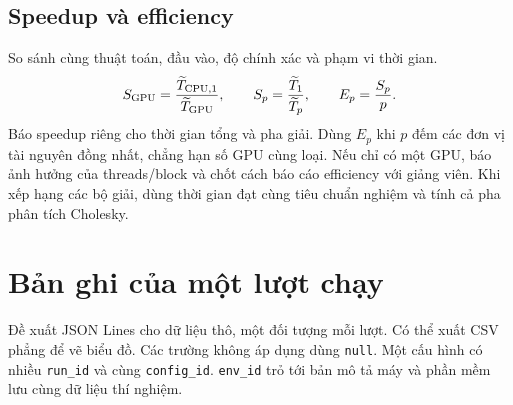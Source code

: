 \documentclass[11pt,a4paper]{article}
\newcommand{\field}[1]{\texttt{#1}}
\begin{document}
\subsection{Speedup và efficiency}

So sánh cùng thuật toán, đầu vào, độ chính xác và phạm vi thời gian.
\[
  S_{\rm GPU}=\frac{\widetilde T_{\rm CPU,1}}{\widetilde T_{\rm GPU}},
  \qquad S_p=\frac{\widetilde T_1}{\widetilde T_p},
  \qquad E_p=\frac{S_p}{p}.
\]
Báo speedup riêng cho thời gian tổng và pha giải. Dùng $E_p$ khi $p$
đếm các đơn vị tài nguyên đồng nhất, chẳng hạn số GPU cùng loại. Nếu
chỉ có một GPU, báo ảnh hưởng của threads/block và chốt cách báo cáo
efficiency với giảng viên. Khi xếp hạng các bộ giải, dùng thời gian đạt
cùng tiêu chuẩn nghiệm và tính cả pha phân tích Cholesky.

\newpage
\section{Bản ghi của một lượt chạy}

Đề xuất JSON Lines cho dữ liệu thô, một đối tượng mỗi lượt. Có thể xuất
CSV phẳng để vẽ biểu đồ. Các trường không áp dụng dùng \field{null}.
Một cấu hình có nhiều \field{run\_id} và cùng \field{config\_id}.
\field{env\_id} trỏ tới bản mô tả máy và phần mềm lưu cùng dữ liệu thí nghiệm.
\end{document}
